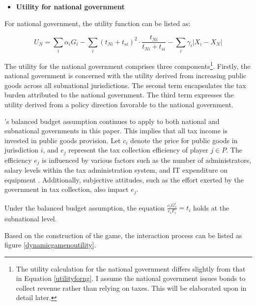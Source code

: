 \begin{itemize}
    \item \textbf{Utility for national government}
\end{itemize}

For national government, the utility function can be listed as:

\begin{equation}
    U_N = \sum_i \alpha_i G_i - \sum_i (t_{Ni}+t_{si})^2\cdot \frac{t_{Ni}}{t_{Ni}+t_{si}} - \sum_i \gamma_i |X_i-X_N| \label{utilityforng}
\end{equation}


The utility for the national government comprises three components\footnote{The utility calculation for the national government differs slightly from that in Equation \ref{utilityforng}. I assume the national government issues bonds to collect revenue rather than relying on taxes. This will be elaborated upon in detail later.}.  Firstly, the national government is concerned with the utility derived from increasing public goods across all subnational jurisdictions. The second term encapsulates the tax burden attributed to the national government. The third term expresses the utility derived from a policy direction favorable to the national government.%


\Textcite{volden2007intergovernmental}'s balanced budget assumption continues to apply to both national and subnational governments in this paper. This implies that all tax income is invested in public goods provision. Let $c_i$ denote the price for public goods in jurisdiction $i$, and $e_j$ represent the tax collection efficiency of player $j \in P$. The efficiency $e_j$ is influenced by various factors such as the number of administrators, salary levels within the tax administration system, and IT expenditure on equipment \parencite{savic2015impact, kiser1994could, aizenman2008collection, mattos2011flypaper}. Additionally, subjective attitudes, such as the effort exerted by the government in tax collection, also impact $e_j$.

Under the balanced budget assumption, the equation $\frac{c_i G_s^i}{e_i F_i}=t_i$ holds at the subnational level.\label{priceandeffort}

Based on the construction of the game, the interaction process can be listed as figure \ref{dynamicgamenoutility}.


